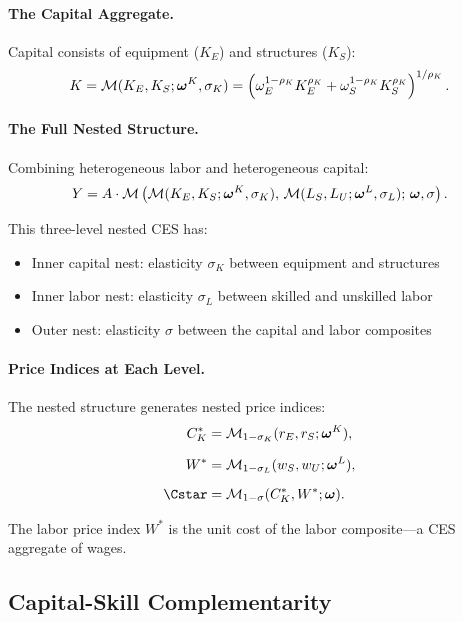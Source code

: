 \paragraph{The Capital Aggregate.}
Capital consists of equipment ($K_E$) and structures ($K_S$):
\begin{equation}
K = \mathcal{M}(K_E, K_S; \boldsymbol{\omega}^K, \sigma_K) = \left( \omega_E^{1-\rho_K} K_E^{\rho_K} + \omega_S^{1-\rho_K} K_S^{\rho_K} \right)^{1/\rho_K}.
\label{eq:capital-aggregate}
\end{equation}

\paragraph{The Full Nested Structure.}
Combining heterogeneous labor and heterogeneous capital:
\begin{equation}
Y = A \cdot \mathcal{M}\left( \mathcal{M}(K_E, K_S; \boldsymbol{\omega}^K, \sigma_K), \, \mathcal{M}(L_S, L_U; \boldsymbol{\omega}^L, \sigma_L); \, \boldsymbol{\omega}, \sigma \right).
\label{eq:full-nested}
\end{equation}

This three-level nested CES has:
\begin{itemize}[nosep]
\item Inner capital nest: elasticity $\sigma_K$ between equipment and structures
\item Inner labor nest: elasticity $\sigma_L$ between skilled and unskilled labor
\item Outer nest: elasticity $\sigma$ between the capital and labor composites
\end{itemize}

\paragraph{Price Indices at Each Level.}
The nested structure generates nested price indices:
\begin{align}
C_K^* &= \M_{1-\sigma_K}(r_E, r_S; \bom^K), \label{eq:capital-price-index} \\[6pt]
W^* &= \M_{1-\sigma_L}(w_S, w_U; \bom^L), \label{eq:labor-price-index} \\[6pt]
\Cstar &= \M_{1-\sigma}(C_K^*, W^*; \bom). \label{eq:total-price-index}
\end{align}

The labor price index $W^*$ is the unit cost of the labor composite---a CES aggregate of wages.

\subsection{Capital-Skill Complementarity}
\label{subsec:capital-skill-complementarity}

